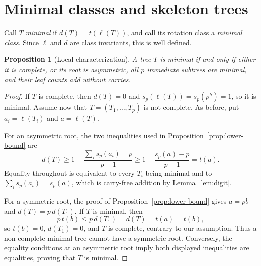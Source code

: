 \documentclass[11pt]{amsart}
\newtheorem{proposition}[theorem]{Proposition}
\theoremstyle{definition}
\theoremstyle{remark}
\begin{document}
\section{Minimal classes and skeleton trees}
Call $T$ \emph{minimal} if $d(T)=t(\ell(T))$, and call its rotation class a \emph{minimal class}.  Since $\ell$ and $d$ are class invariants, this is well defined.
\begin{proposition}[Local characterization]\label{prop:minimal-local}
A tree $T$ is minimal if and only if either it is complete, or its root is asymmetric, all $p$ immediate subtrees are minimal, and their leaf counts add without carries.
\end{proposition}
\begin{proof}
If $T$ is complete, then $d(T)=0$ and $s_p(\ell(T))=s_p(p^h)=1$, so it is minimal.  Assume now that $T=(T_1,\ldots,T_p)$ is not complete.  As before, put $a_i=\ell(T_i)$ and $a=\ell(T)$.

For an asymmetric root, the two inequalities used in Proposition~\ref{prop:lower-bound} are
\[
 d(T)\ge1+\frac{\sum_is_p(a_i)-p}{p-1}
 \ge1+\frac{s_p(a)-p}{p-1}=t(a).
\]
Equality throughout is equivalent to every $T_i$ being minimal and to $\sum_is_p(a_i)=s_p(a)$, which is carry-free addition by Lemma~\ref{lem:digit}.

For a symmetric root, the proof of Proposition~\ref{prop:lower-bound} gives $a=pb$ and $d(T)=p\,d(T_1)$.  If $T$ is minimal, then
\[
 p\,t(b)\le p\,d(T_1)=d(T)=t(a)=t(b),
\]
so $t(b)=0$, $d(T_1)=0$, and $T$ is complete, contrary to our assumption.  Thus a non-complete minimal tree cannot have a symmetric root.  Conversely, the equality conditions at an asymmetric root imply both displayed inequalities are equalities, proving that $T$ is minimal.
\end{proof}
\end{document}
